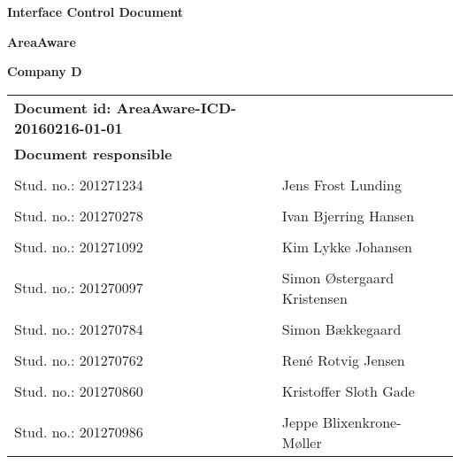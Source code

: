
\centerline{\Huge\bfseries\color{ThemeColor} Interface Control Document} 

\vspace{1em}
\centerline{\Large\bfseries\color{BlackColor} AreaAware} 

\vspace{5em}
\centerline{\large\bfseries\color{BlackColor}Company D} 




\begin{center}
	\begin{tabular}{ l l p{6cm} }
		\textbf{Document id: AreaAware-ICD-20160216-01-01}& & \\
		\textbf{Document responsible}& & \\
		& & \\
		Stud. no.:  201271234 & Jens Frost Lunding & \\\hline
		& & \\
		Stud. no.:  201270278 & Ivan Bjerring Hansen & \\\hline
		& & \\
		Stud. no.:  201271092 & Kim Lykke Johansen & \\\hline
		& & \\	
		Stud. no.:  201270097 & Simon Østergaard Kristensen & \\\hline
		& & \\
		Stud. no.:  201270784 & Simon Bækkegaard & \\\hline
		& & \\
		Stud. no.: 	201270762 & René Rotvig Jensen & \\\hline
		& & \\
		Stud. no.: 	201270860 & Kristoffer Sloth Gade & \\\hline
		& & \\
		Stud. no.: 	201270986 & Jeppe Blixenkrone-Møller & \\\hline
	\end{tabular}     	
\end{center}
\thispagestyle{empty} %
\restoregeometry



		